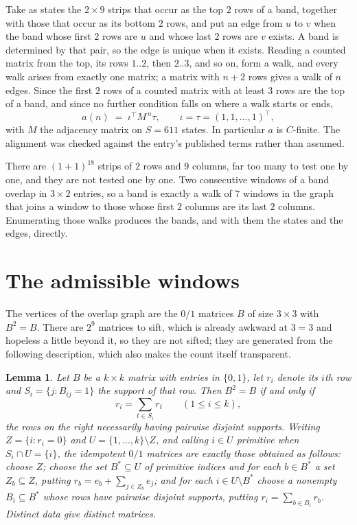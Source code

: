 \documentclass[11pt,a4paper]{article}
\theoremstyle{plain}
\newtheorem{lemma}[theorem]{Lemma}
\theoremstyle{definition}
\begin{document}
Take as states the $2\times9$ strips that occur as the top $2$ rows of a band,
together with those that occur as its bottom $2$ rows, and put an edge from $u$ to $v$
when the band whose first $2$ rows are $u$ and whose last $2$ rows are $v$ exists.
A band is determined by that pair, so the edge is unique when it exists. Reading a counted
matrix from the top, its rows $1..2$, then $2..3$, and so on, form a walk, and every
walk arises from exactly one matrix; a matrix with $n+2$ rows gives a walk of $n$ edges.
Since the first $2$ rows of a counted matrix with at least $3$ rows are the top of a
band, and since no further condition falls on where a walk starts or ends,
\[
a(n)\;=\;\iota^{\!\top}M^{\,n}\tau ,\qquad \iota=\tau=(1,1,\dots,1)^{\!\top},
\]
with $M$ the adjacency matrix on $S=611$ states. In particular $a$ is $C$-finite. The
alignment was checked against the entry's published terms rather than assumed.

There are $(1 + 1)^{18}$ strips of $2$ rows and $9$ columns, far too
many to test one by one, and they are not tested one by one. Two consecutive windows of a band
overlap in $3\times2$ entries, so a band is exactly a walk of $7$ windows in
the graph that joins a window to those whose first $2$ columns are its last $2$
columns. Enumerating those walks produces the bands, and with them the states and the edges,
directly.

\section{The admissible windows}

The vertices of the overlap graph are the $0/1$ matrices $B$ of size $3\times3$ with
$B^2=B$. There are $2^{9}$ matrices to sift, which is already awkward at $3=3$ and
hopeless a little beyond it, so they are not sifted; they are generated from the following
description, which also makes the count itself transparent.

\begin{lemma}\label{lem:idem}
Let $B$ be a $k\times k$ matrix with entries in $\{0,1\}$, let $r_i$ denote its $i$th row and
$S_i=\{j:B_{ij}=1\}$ the support of that row. Then $B^2=B$ if and only if
\[
r_i=\sum_{t\in S_i}r_t \qquad (1\le i\le k),
\]
the rows on the right necessarily having pairwise disjoint supports. Writing
$Z=\{i:r_i=0\}$ and $U=\{1,\dots,k\}\setminus Z$, and calling $i\in U$ \emph{primitive}
when $S_i\cap U=\{i\}$, the idempotent $0/1$ matrices are exactly those obtained as follows:
choose $Z$; choose the set $B^{\ast}\subseteq U$ of primitive indices and for each
$b\in B^{\ast}$ a set $Z_b\subseteq Z$, putting $r_b=e_b+\sum_{j\in Z_b}e_j$; and for each
$i\in U\setminus B^{\ast}$ choose a nonempty $B_i\subseteq B^{\ast}$ whose rows have
pairwise disjoint supports, putting $r_i=\sum_{b\in B_i}r_b$. Distinct data give distinct
matrices.
\end{lemma}
\end{document}
